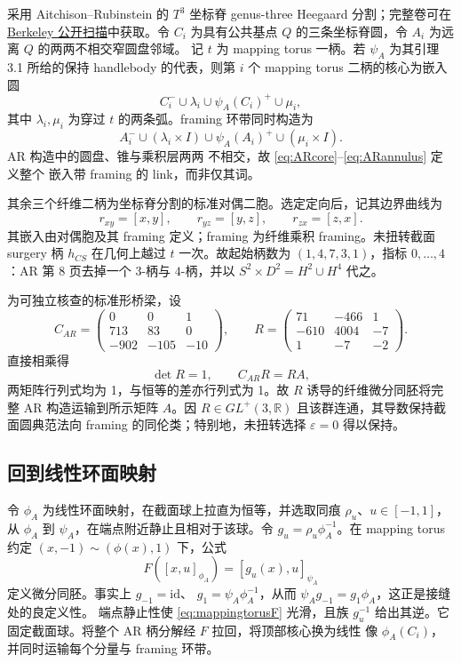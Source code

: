 \documentclass[11pt]{amsart}
\theoremstyle{definition}
\theoremstyle{remark}
\begin{document}
采用 Aitchison--Rubinstein
\cite[pp.~5--12]{AitchisonRubinstein1984} 的 $T^3$ 坐标脊 genus-three Heegaard 分割；完整卷可在
\href{https://math.berkeley.edu/~kirby/papers/Gordon%20and%20Kirby%20%28editors%29%20-%20Four-manifold%20theory%20%28Durham%29%20-%20MR0780574.pdf}
{Berkeley 公开扫描}中获取。令
$C_i$ 为具有公共基点 $Q$ 的三条坐标脊圆，令
$A_i$ 为远离 $Q$ 的两两不相交窄圆盘邻域。
记 $t$ 为 mapping torus 一柄。若 $\psi_A$ 为其引理 3.1 所给的保持 handlebody 的代表，则第 $i$ 个 mapping torus 二柄的核心为嵌入圆
\begin{equation}\label{eq:ARcore}
C_i^-\cup\lambda_i\cup\psi_A(C_i)^+\cup\mu_i,
\end{equation}
其中 $\lambda_i,\mu_i$ 为穿过 $t$ 的两条弧。framing 环带同时构造为
\begin{equation}\label{eq:ARannulus}
A_i^-\cup(\lambda_i\times I)\cup\psi_A(A_i)^+
       \cup(\mu_i\times I).
\end{equation}
AR 构造中的圆盘、锥与乘积层两两
不相交，故 \eqref{eq:ARcore}--\eqref{eq:ARannulus} 定义整个
嵌入带 framing 的 link，而非仅其词。

其余三个纤维二柄为坐标脊分割的标准对偶二胞。选定定向后，记其边界曲线为
\[
r_{xy}=[x,y],\qquad r_{yz}=[y,z],\qquad r_{zx}=[z,x].
\]
其嵌入由对偶胞及其 framing 定义；framing 为纤维乘积 framing。未扭转截面 surgery 柄 $h_{CS}$ 在几何上越过 $t$ 一次。故起始柄数为
$(1,4,7,3,1)$，指标 $0,\ldots,4$：AR 第 8 页去掉一个 $3$-柄与
$4$-柄，并以 $S^2\times D^2=H^2\cup H^4$ 代之。

为可独立核查的标准形桥梁，设
\[
C_{AR}=\begin{pmatrix}0&0&1\\713&83&0\\-902&-105&-10\end{pmatrix},
\qquad
R=\begin{pmatrix}71&-466&1\\-610&4004&-7\\1&-7&-2\end{pmatrix}.
\]
直接相乘得
\[
\det R=1,\qquad C_{AR}R=RA,
\]
两矩阵行列式均为 1，与恒等的差亦行列式为 1。故 $R$ 诱导的纤维微分同胚将完整 AR 构造运输到所示矩阵 $A$。因
$R\in GL^+(3,\mathbb R)$ 且该群连通，其导数保持截面圆典范法向 framing 的同伦类；特别地，未扭转选择 $\varepsilon=0$ 得以保持。

\subsection{回到线性环面映射}

令 $\phi_A$ 为线性环面映射，在截面球上拉直为恒等，并选取同痕 $\rho_u$、$u\in[-1,1]$，从 $\phi_A$ 到
$\psi_A$，在端点附近静止且相对于该球。令
$g_u=\rho_u\phi_A^{-1}$。在 mapping torus 约定
$(x,-1)\sim(\phi(x),1)$ 下，公式
\begin{equation}\label{eq:mappingtorusF}
F([x,u]_{\phi_A})=[g_u(x),u]_{\psi_A}
\end{equation}
定义微分同胚。事实上 $g_{-1}=\mathrm{id}$、
$g_1=\psi_A\phi_A^{-1}$，从而
$\psi_Ag_{-1}=g_1\phi_A$，这正是接缝处的良定义性。
端点静止性使 \eqref{eq:mappingtorusF} 光滑，且族
$g_u^{-1}$ 给出其逆。它固定截面球。将整个
AR 柄分解经 $F$ 拉回，将顶部核心换为线性
像 $\phi_A(C_i)$，并同时运输每个分量与 framing 环带。
\end{document}

